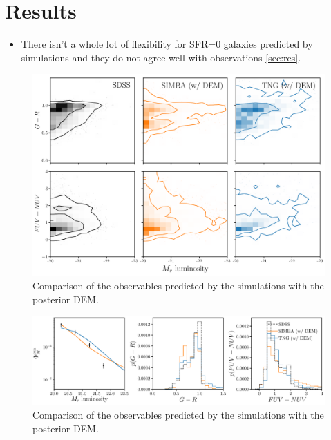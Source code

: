 \section{Results} \label{sec:results}

\begin{itemize}
\item There isn't a whole lot of flexibility for SFR=0 galaxies predicted by
simulations and they do not agree well with observations \ref{sec:res}. 
\end{itemize}

\begin{figure}
\begin{center}
    \includegraphics[width=\textwidth]{figs/abc_observables.pdf}
    \caption{Comparison of the observables predicted by the simulations with
    the posterior DEM.}
\label{fig:dem}
\end{center}
\end{figure}



\begin{figure}
\begin{center}
    \includegraphics[width=\textwidth]{figs/abc_observables_1d.pdf}
    \caption{Comparison of the observables predicted by the simulations with
    the posterior DEM.}
\label{fig:dem}
\end{center}
\end{figure}

